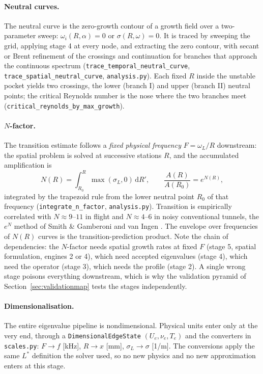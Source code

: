 \documentclass[11pt]{article}
\begin{document}
\paragraph{Neutral curves.} The neutral curve is the zero-growth contour of a growth field over
a two-parameter sweep: $\omega_i(R,\alpha)=0$ or $\sigma(R,\omega)=0$. It is traced by sweeping
the grid, applying stage 4 at every node, and extracting the zero contour, with secant or Brent
refinement of the crossings and continuation for branches that approach the continuous spectrum
(\texttt{trace\_temporal\_neutral\_curve}, \texttt{trace\_spatial\_neutral\_curve},
\texttt{analysis.py}). Each fixed $R$ inside the unstable pocket yields two crossings, the lower
(branch I) and upper (branch II) neutral points; the critical Reynolds number is the nose where
the two branches meet (\texttt{critical\_reynolds\_by\_max\_growth}).

\paragraph{$N$-factor.} The transition estimate follows a \emph{fixed physical frequency}
$F=\omega_L/R$ downstream: the spatial problem is solved at successive stations $R$, and the
accumulated amplification is
\begin{equation}\label{eq:nfactor}
  N(R)=\int_{R_0}^{R}\max(\sigma_L,0)\,\mathrm dR',\qquad \frac{A(R)}{A(R_0)}=e^{N(R)},
\end{equation}
integrated by the trapezoid rule from the lower neutral point $R_0$ of that frequency
(\texttt{integrate\_n\_factor}, \texttt{analysis.py}). Transition is empirically correlated with
$N\approx9$--$11$ in flight and $N\approx4$--$6$ in noisy conventional tunnels, the $e^N$ method
of Smith \& Gamberoni and van Ingen \cite{smith1956,vaningen1956}. The envelope over frequencies
of $N(R)$ curves is the transition-prediction product. Note the chain of dependencies: the
$N$-factor needs spatial growth rates at fixed $F$ (stage 5, spatial formulation, engines 2 or
4), which need accepted eigenvalues (stage 4), which need the operator (stage 3), which needs
the profile (stage 2). A single wrong stage poisons everything downstream, which is why the
validation pyramid of Section~\ref{sec:validationmap} tests the stages independently.

\paragraph{Dimensionalisation.} The entire eigenvalue pipeline is nondimensional. Physical units
enter only at the very end, through a \texttt{DimensionalEdgeState} $(U_e,\nu_e,T_e)$ and the
converters in \texttt{scales.py}: $F\to f$ [kHz], $R\to x$ [mm], $\sigma_L\to\sigma$ [1/m]. The
conversions apply the same $L^*$ definition the solver used, so no new physics and no new
approximation enters at this stage.
\end{document}
